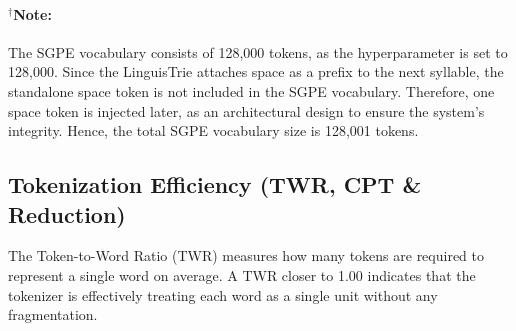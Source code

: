 \paragraph{$^\dagger$Note:} The SGPE vocabulary consists of 128,000 tokens, as the hyperparameter is set to 128,000. Since the LinguisTrie attaches space as a prefix to the next syllable, the standalone space token is not included in the SGPE vocabulary. Therefore, one space token is injected later, as an architectural design to ensure the system's integrity. Hence, the total SGPE vocabulary size is 128,001 tokens.

\subsection{Tokenization Efficiency (TWR, CPT \& Reduction)}
The Token-to-Word Ratio (TWR) measures how many tokens are required to represent a single word on average. A TWR closer to 1.00 indicates that the tokenizer is effectively treating each word as a single unit without any fragmentation.

